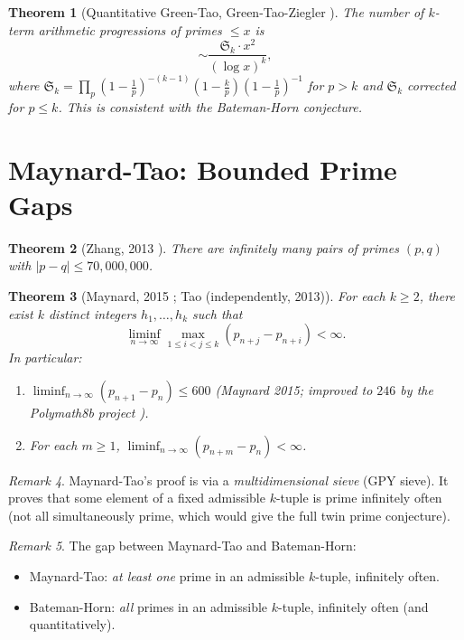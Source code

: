 \documentclass[12pt,a4paper]{amsart}
\newtheorem{theorem}{Theorem}[section]
\theoremstyle{definition}
\theoremstyle{remark}
\newtheorem{remark}[theorem]{Remark}
\newcommand{\BH}{\mathfrak{S}}
\begin{document}
\begin{theorem}[Quantitative Green-Tao, Green-Tao-Ziegler \cite{GTZ2012}]
  The number of $k$-term arithmetic progressions of primes $\leq x$ is
  \[
    \sim \frac{\BH_k \cdot x^2}{(\log x)^k},
  \]
  where $\BH_k = \prod_p \left(1-\frac{1}{p}\right)^{-(k-1)}\left(1-\frac{k}{p}\right)\left(1-\frac{1}{p}\right)^{-1}$
  for $p > k$ and $\BH_k$ corrected for $p \leq k$.
  This is consistent with the Bateman-Horn conjecture.
\end{theorem}

\section{Maynard-Tao: Bounded Prime Gaps}\label{sec:maynard}

\begin{theorem}[Zhang, 2013 \cite{Zhang2013}]
  There are infinitely many pairs of primes $(p, q)$ with $|p - q| \leq 70{,}000{,}000$.
\end{theorem}

\begin{theorem}[Maynard, 2015 \cite{Maynard2015}; Tao (independently, 2013)]
  \label{thm:maynard}
  For each $k \geq 2$, there exist $k$ distinct integers $h_1,\ldots,h_k$ such that
  \[
    \liminf_{n\to\infty} \max_{1 \leq i < j \leq k} (p_{n+j} - p_{n+i}) < \infty.
  \]
  In particular:
  \begin{enumerate}[label=(\roman*)]
    \item $\liminf_{n\to\infty} (p_{n+1} - p_n) \leq 600$ (Maynard 2015; improved to
      $246$ by the Polymath8b project \cite{Polymath2014}).
    \item For each $m \geq 1$, $\liminf_{n\to\infty}(p_{n+m} - p_n) < \infty$.
  \end{enumerate}
\end{theorem}

\begin{remark}
  Maynard-Tao's proof is via a \emph{multidimensional sieve} (GPY sieve).
  It proves that some element of a fixed admissible $k$-tuple is prime infinitely often
  (not all simultaneously prime, which would give the full twin prime conjecture).
\end{remark}

\begin{remark}
  The gap between Maynard-Tao and Bateman-Horn:
  \begin{itemize}
    \item Maynard-Tao: \emph{at least one} prime in an admissible $k$-tuple, infinitely often.
    \item Bateman-Horn: \emph{all} primes in an admissible $k$-tuple, infinitely often
      (and quantitatively).
  \end{itemize}
\end{remark}
\end{document}
